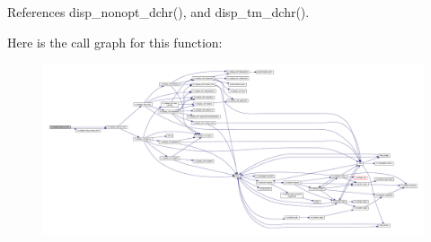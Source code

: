 References disp\+\_\+nonopt\+\_\+dchr(), and disp\+\_\+tm\+\_\+dchr().

Here is the call graph for this function\+:
\nopagebreak
\begin{figure}[H]
\begin{center}
\leavevmode
\includegraphics[width=350pt]{namespacem__display_a337ce942da78737d24272e0c0cf55fbb_cgraph}
\end{center}
\end{figure}
\mbox{\label{namespacem__display_a7d4d5976a28b9a9ee9bad6afb0f8a7b9}} 
